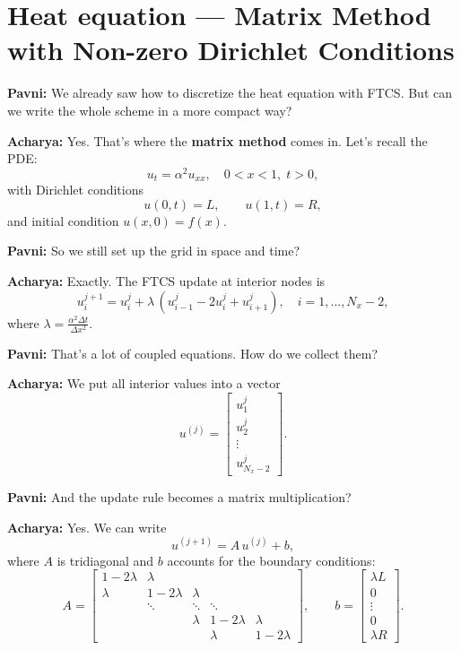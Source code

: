 \documentclass[
  letterpaper,
]{book}
\begin{document}
\section{Heat equation --- Matrix Method with Non-zero Dirichlet
Conditions}\label{heat-equation-matrix-method-with-non-zero-dirichlet-conditions}

\textbf{Pavni:} We already saw how to discretize the heat equation with
FTCS. But can we write the whole scheme in a more compact way?

\textbf{Acharya:} Yes. That's where the \textbf{matrix method} comes in.
Let's recall the PDE: \[
u_t = \alpha^2 u_{xx}, \quad 0 < x < 1, \; t > 0,
\] with Dirichlet conditions \[
u(0,t) = L, \qquad u(1,t) = R,
\] and initial condition \(u(x,0)=f(x)\).

\textbf{Pavni:} So we still set up the grid in space and time?

\textbf{Acharya:} Exactly. The FTCS update at interior nodes is \[
u_i^{j+1} = u_i^j + \lambda \,(u_{i-1}^j - 2u_i^j + u_{i+1}^j),
\quad i=1,\dots,N_x-2,
\] where \(\lambda = \tfrac{\alpha^2 \Delta t}{\Delta x^2}\).

\textbf{Pavni:} That's a lot of coupled equations. How do we collect
them?

\textbf{Acharya:} We put all interior values into a vector \[
u^{(j)} =
\begin{bmatrix}
u_1^j \\
u_2^j \\
\vdots \\
u_{N_x-2}^j
\end{bmatrix}.
\]

\textbf{Pavni:} And the update rule becomes a matrix multiplication?

\textbf{Acharya:} Yes. We can write \[
u^{(j+1)} = A\,u^{(j)} + b,
\] where \(A\) is tridiagonal and \(b\) accounts for the boundary
conditions: \[
A =
\begin{bmatrix}
1-2\lambda & \lambda     &        &        &   \\
\lambda     & 1-2\lambda & \lambda      &        &   \\
      & \ddots & \ddots & \ddots &   \\
      &        & \lambda      & 1-2\lambda   & \lambda \\
      &        &        & \lambda      & 1-2\lambda
\end{bmatrix}, \qquad
b =
\begin{bmatrix}
\lambda L \\
0 \\
\vdots \\
0 \\
\lambda R
\end{bmatrix}.
\]
\end{document}
